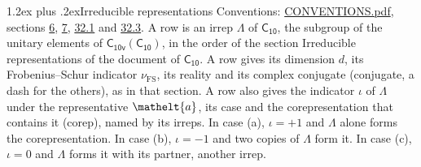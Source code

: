 \documentclass[10pt,a4paper]{article}
\makeatletter
\renewcommand\section{\@startsection{section}{1}{\z@}{-3ex plus -1ex minus -.2ex}%
  {1.2ex plus .2ex}{\normalfont\large\sffamily\bfseries\color{parttitle}}}
\numberwithin{equation}{section}
\newcommand{\eltfont}[1]{{\let\sigma\eltsigma\mathelt{#1}}}
\newcommand{\grp}[1]{\mathsf{#1}}
\newcommand{\elt}[1]{\eltfont{#1}}
\newcommand{\fsind}{\nu_{\mathrm{FS}}}
\makeatother
\begin{document}
\section{Irreducible representations}\label{s:irreps}
Conventions: \href{../../CONVENTIONS.pdf}{CONVENTIONS.pdf}, sections \href{../../../rotation/CONVENTIONS.pdf\#conv.6}{6}, \href{../../../rotation/CONVENTIONS.pdf\#conv.7}{7}, \href{../../CONVENTIONS.pdf\#conv.32.1}{32.1} and \href{../../CONVENTIONS.pdf\#conv.32.3}{32.3}.
\leavevmode\label{n:irrep.Delta}A row is an irrep $\Lambda$ of $\grp{C_{10}}$, the subgroup of the unitary elements of $\grp{C_{10v}}(\grp{C_{10}})$, in the order of the section Irreducible representations of the document of \href{../../../rotation/data/pdf/C10.pdf}{$\grp{C_{10}}$}. \label{n:index.dimension}\label{n:index.frobenius}\label{n:head.irrep}\label{n:head.reality}\label{n:head.conjugate}A row gives its dimension $d$, its Frobenius--Schur indicator $\fsind$, its reality and its complex conjugate (conjugate, a dash for the others), as in that section. \label{n:head.case.corep}\label{n:head.corep}A row also gives the indicator $\iota$ of $\Lambda$ under the representative $\elt{a}$, its case and the corepresentation that contains it (corep), named by its irreps. In case (a), $\iota = +1$ and $\Lambda$ alone forms the corepresentation. In case (b), $\iota = -1$ and two copies of $\Lambda$ form it. In case (c), $\iota = 0$ and $\Lambda$ forms it with its partner, another irrep.
\setlength{\emergencystretch}{2em}\par\setlength{\emergencystretch}{0pt}
\end{document}
